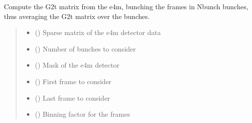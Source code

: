 \documentclass[letterpaper,10pt,english]{sphinxmanual}
\begin{document}

\begin{fulllineitems}
\label{\detokenize{index:XPCS_tools.get_G2t_bybunch}}
\pysigstartsignatures
\pysiglinewithargsret
{}
{\sphinxparamcomma {}\sphinxparamcomma {}\sphinxparamcomma {}\sphinxparamcomma {}\sphinxparamcomma {}\sphinxparamcomma {}\sphinxparamcomma {}}
{}
\pysigstopsignatures
\sphinxAtStartPar
Compute the G2t matrix from the e4m, bunching the frames in Nbunch bunches, thus averaging the G2t matrix over the bunches.
\begin{quote}\begin{description}
\begin{itemize}
\item {} 
\sphinxAtStartPar
{} () \textendash{} Sparse matrix of the e4m detector data

\item {} 
\sphinxAtStartPar
{} () \textendash{} Number of bunches to consider

\item {} 
\sphinxAtStartPar
{} () \textendash{} Mask of the e4m detector

\item {} 
\sphinxAtStartPar
{} () \textendash{} First frame to consider

\item {} 
\sphinxAtStartPar
{} () \textendash{} Last frame to consider

\item {} 
\sphinxAtStartPar
{} () \textendash{} Binning factor for the frames


\end{itemize}
\end{description}
\end{quote}
\end{fulllineitems}
\end{document}
